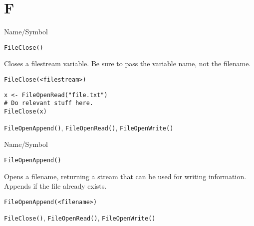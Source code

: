 \rl

\section{F}
\rl



\begin{desc}{Name/Symbol}
\item[Name/Symbol]	\verb+FileClose()+

\item[Description]	Closes a filestream  variable.  Be sure to 
		pass the variable name, not the filename.  

\item[Usage]
\begin{verbatim}
FileClose(<filestream>)
\end{verbatim}

\item[Example]
\begin{verbatim}
x <- FileOpenRead("file.txt")
# Do relevant stuff here.
FileClose(x)
\end{verbatim}

\item[See Also]	\verb+FileOpenAppend()+, \verb+FileOpenRead()+, \verb+FileOpenWrite()+

\end{desc}

\rl




\begin{desc}{Name/Symbol}
\item[Name/Symbol]	\verb+FileOpenAppend()+

\item[Description] Opens a filename, returning a stream that can be
  used for writing information.  Appends if the file already exists.

\item[Usage]
\begin{verbatim}
FileOpenAppend(<filename>)
\end{verbatim}

\item[Example]	

\item[See Also]	\verb+FileClose()+, \verb+FileOpenRead()+, \verb+FileOpenWrite()+
\end{desc}

\rl



